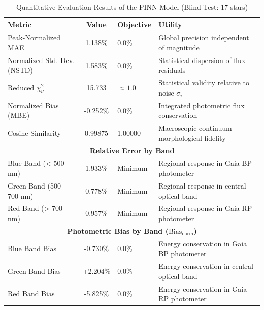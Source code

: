 
\begin{table}[htpb]
\centering
\caption{Quantitative Evaluation Results of the PINN Model (Blind Test: 17 stars)}
\label{tab:pinn_evaluation}
\begin{tabular}{lcll}
\hline
\textbf{Metric} & \textbf{Value} & \textbf{Objective} & \textbf{Utility} \\
\hline
Peak-Normalized MAE & 1.138\% & 0.0\% & Global precision independent of magnitude \\
Normalized Std. Dev. (NSTD) & 1.583\% & 0.0\% & Statistical dispersion of flux residuals \\
Reduced $\chi^2_\nu$ & 15.733 & $\approx 1.0$ & Statistical validity relative to noise $\sigma_i$ \\
Normalized Bias (MBE) & -0.252\% & 0.0\% & Integrated photometric flux conservation \\
Cosine Similarity & 0.99875 & 1.00000 & Macroscopic continuum morphological fidelity \\
\hline
\multicolumn{4}{c}{\textbf{Relative Error by Band}} \\
\hline
Blue Band (< 500 nm) & 1.933\% & Minimum & Regional response in Gaia BP photometer \\
Green Band (500 - 700 nm) & 0.778\% & Minimum & Regional response in central optical band \\
Red Band (> 700 nm) & 0.957\% & Minimum & Regional response in Gaia RP photometer \\
\hline
\multicolumn{4}{c}{\textbf{Photometric Bias by Band ($\text{Bias}_{\text{norm}}$)}} \\
\hline
Blue Band Bias & -0.730\% & 0.0\% & Energy conservation in Gaia BP photometer \\
Green Band Bias & +2.204\% & 0.0\% & Energy conservation in central optical band \\
Red Band Bias & -5.825\% & 0.0\% & Energy conservation in Gaia RP photometer \\
\hline
\end{tabular}
\end{table}
